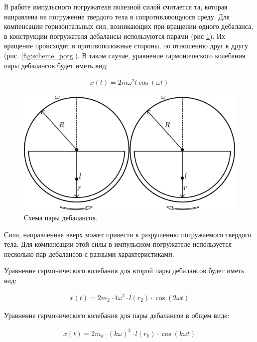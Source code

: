 В работе импульсного погружателя полезной силой считается та, которая направлена на погружение твердого тела в сопротивляющуюся среду.
Для компенсации горизонтальных сил, возникающих при вращении одного дебаланса,
в конструкции погружателя дебалансы используются парами (рис \ref{fig:double_debalance}).
Их вращение происходит в противоположные стороны, по отношению друг к другу (рис. \ref{fig:scheme_porg}).
В таком случае, уравнение гармонического колебания пары дебалансов будет иметь вид:

\begin{equation}\label{eq:harmonic_dual}
    \begin{aligned}
        x(t) = 2 m \omega^2 l \cos (\omega t)
    \end{aligned}
\end{equation}

\begin{figure}[h]
    \centering
    \includegraphics[width=0.8\linewidth]{img/double_debalance.png}
    \caption{Схема пары дебалансов.}
    \label{fig:double_debalance}
\end{figure}

Сила, направленная вверх может привести к разрушению погружаемого твердого тела.
Для компенсации этой силы в импульсном погружателе используется несколько пар дебалансов с разными характеристиками.

Уравнение гармонического колебания для второй пары дебалансов будет иметь вид:

\begin{equation*}
    \begin{aligned}
        x(t) = 2 m_2 \cdot 4 \omega^2 \cdot l(r_2) \cdot \cos (2 \omega t)
    \end{aligned}
\end{equation*}

Уравнение гармонического колебания для пары дебалансов в общем виде:

\begin{equation}\label{eq:harmonic_common}
    \begin{aligned}
        x(t) = 2 m_k \cdot (k \omega)^2 \cdot l(r_k) \cdot \cos (k \omega t)
    \end{aligned}
\end{equation}

